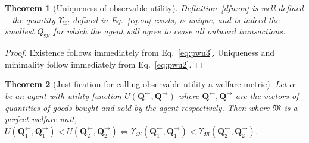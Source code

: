 \documentclass{journal}
\theoremstyle{plain}
\newtheorem{thm}{Theorem}
\theoremstyle{definition}
\theoremstyle{remark}
\newcommand{\quants}{\ensuremath{Q}} %
\newcommand{\quantl}{\ensuremath{\mathbf{Q}}} %
\newcommand{\agenta}{\ensuremath{\alpha}}
\newcommand{\money}{\ensuremath{\mathfrak{M}}}
\newcommand{\utility}{\ensuremath{U}}
\newcommand{\outility}{\ensuremath{\Upsilon}}
\begin{document}
\begin{thm}[Uniqueness of observable utility]
    \label{thm:unique}
    Definition~\ref{dfn:ou} is well-defined -- the quantity $\outility_\money$ defined in Eq.~\ref{eq:ou} exists, is unique, and is indeed the smallest $\quants_\money$ for which the agent will agree to cease all outward transactions. 
\end{thm}
\begin{proof}
    Existence follows immediately from Eq.~\ref{eq:pwu3}. Uniqueness and minimality follow immediately from Eq.~\ref{eq:pwu2}.
\end{proof}

\begin{thm}[Justification for calling observable utility a welfare metric]
    \label{thm:welfare}
    Let $\agenta$ be an agent with utility function $\utility(\quantl^{\leftarrow}, \quantl^{\rightarrow})$ where $\quantl^\leftarrow, \quantl^\rightarrow$ are the vectors of quantities of goods bought and sold by the agent respectively. Then where $\money$ is a perfect welfare unit, $\utility(\quantl_1^\leftarrow, \quantl_1^\rightarrow)<\utility(\quantl_2^\leftarrow, \quantl_2^\rightarrow) \iff \outility_\money(\quantl_1^\leftarrow, \quantl_1^\rightarrow)<\outility_\money(\quantl_2^\leftarrow, \quantl_2^\rightarrow)$.
\end{thm}
\end{document}
